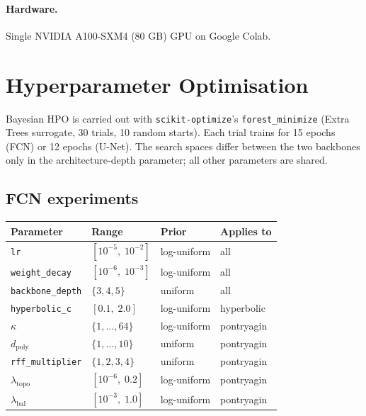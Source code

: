 \documentclass[12pt,a4paper]{article}
\newcommand{\kap}{\kappa}
\newcommand{\dpoly}{d_{\mathrm{poly}}}
\theoremstyle{definition}
\begin{document}
\paragraph{Hardware.}  Single NVIDIA A100-SXM4 (80 GB) GPU on Google Colab.

\section{Hyperparameter Optimisation}

Bayesian HPO is carried out with \texttt{scikit-optimize}'s
\texttt{forest\_minimize} (Extra Trees surrogate, 30 trials, 10 random
starts).  Each trial trains for 15 epochs (FCN) or 12 epochs (U-Net).
The search spaces differ between the two backbones only in the
architecture-depth parameter; all other parameters are shared.

\subsection{FCN experiments}
\label{sec:hpo_fcn}

\begin{center}
\begin{tabular}{llll}
\toprule
Parameter & Range & Prior & Applies to \\
\midrule
\texttt{lr}              & $[10^{-5},\; 10^{-2}]$ & log-uniform & all \\
\texttt{weight\_decay}   & $[10^{-6},\; 10^{-3}]$ & log-uniform & all \\
\texttt{backbone\_depth} & $\{3, 4, 5\}$           & uniform     & all \\
\texttt{hyperbolic\_c}   & $[0.1,\; 2.0]$          & log-uniform & hyperbolic \\
$\kap$                   & $\{1,\ldots,64\}$       & log-uniform & pontryagin \\
$\dpoly$                 & $\{1,\ldots,10\}$       & uniform     & pontryagin \\
\texttt{rff\_multiplier} & $\{1,2,3,4\}$           & uniform     & pontryagin \\
$\lambda_{\text{topo}}$  & $[10^{-6},\; 0.2]$      & log-uniform & pontryagin \\
$\lambda_{\text{bal}}$   & $[10^{-3},\; 1.0]$      & log-uniform & pontryagin \\
\bottomrule
\end{tabular}
\end{center}
\end{document}
